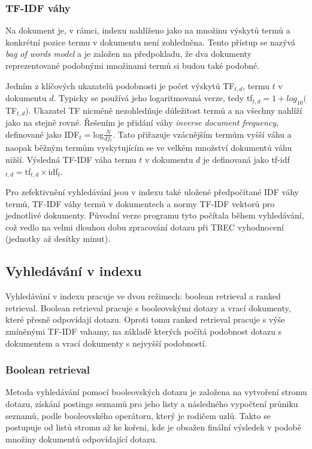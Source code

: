 \documentclass[11pt,a4paper]{scrartcl}
\begin{document}
	\subsubsection{TF-IDF váhy}
	Na dokument je, v rámci, indexu nahlíženo jako na množinu výskytů termů a konkrétní pozice termu v dokumentu není zohledněna. Tento přístup se nazývá \textit{bag of words model} a je založen na předpokladu, že dva dokumenty reprezentované podobnými množinami termů si budou také podobné.
	
	Jedním z klíčových ukazatelů podobnosti je počet výskytů TF$_{t,d}$, termu $t$ v dokumentu $d$. Typicky se používá jeho logaritmovaná verze, tedy tf$_{t,d}=1+log_{10}($TF$_{t,d})$. Ukazatel TF nicméně nezohledňuje důležitost termů a na všechny nahlíží jako na stejně rovné. Řešením je přidání váhy \textit{inverse document frequency}, definované jako IDF$_t=$log$\frac{N}{df_t}$. Tato přiřazuje vzácnějším termům vyšší váhu a naopak běžným termům vyskytujícím se ve velkém množství dokumentů váhu nižší. Výsledná TF-IDF váha termu $t$ v dokumentu $d$ je definovaná jako tf-idf$_{t,d}=$tf$_{t,d}\times$idf$_t$.  
	
	Pro zefektivnění vyhledávání jsou v indexu také uložené předpočítané IDF váhy termů, TF-IDF váhy termů v dokumentech a normy TF-IDF vektorů pro jednotlivé dokumenty. Původní verze programu tyto počítala během vyhledávání, což vedlo na velmi dlouhou dobu zpracování dotazu při TREC vyhodnocení (jednotky až desítky minut).
	
	\subsection{Vyhledávání v indexu}
	
	Vyhledávání v indexu pracuje ve dvou režimech: boolean retrieval a ranked retrieval. Boolean retrieval pracuje s booleovskými dotazy a vrací dokumenty, které přesně odpovídají dotazu. Oproti tomu ranked retrieval pracuje s výše zmíněnými TF-IDF vahamy, na základě kterých počítá podobnost dotazu s dokumentem a vrací dokumenty s nejvyšší podobností.
	
	\subsubsection{Boolean retrieval}

	Metoda vyhledávání pomocí booleovských dotazu je založena na vytvoření stromu dotazu, získání postings seznamů pro jeho listy a následného vypočtení průniku seznamů, podle booleovského operátoru, který je rodičem uzlů. Takto se postupuje od listů stromu až ke kořeni, kde je obsažen finální výsledek v podobě množiny dokumentů odpovídající dotazu.
	
\end{document}
